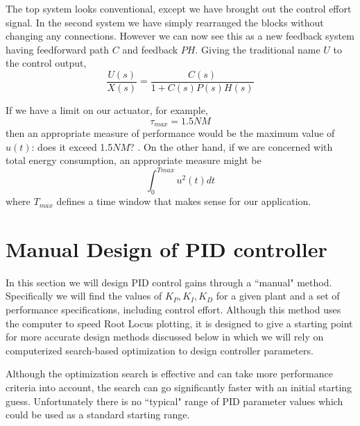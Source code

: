 The top system looks conventional, except we have brought out the control effort signal.   In the second system we have simply rearranged the blocks without changing any connections.   However we can now see this as a new feedback system having feedforward path $C$ and feedback $PH$.  Giving the traditional name  $U$ to the control output,	%
\[
\frac{U(s)}{X(s)} = \frac {C(s)}  {1+C(s)P(s)H(s)}
\]



If we have a limit on our actuator, for example,	%
\[
\tau_{max} = 1.5 NM
\]
then an appropriate measure of performance would be the maximum value of $u(t)$: does it exceed 1.5$NM$? .   On the other hand, if we are concerned with total energy consumption, an appropriate measure might be	%
\[
\int_0^{Tmax} u^2(t) dt
\]
where $T_{max}$ defines a time window that makes sense for our application.	%










\section{Manual Design of PID controller}

In this section we will design PID control gains through a ``manual" method.  Specifically we will find the values of $K_P, K_I, K_D$ for a given plant and a set of performance specifications, including control effort.  Although this method uses the computer to speed Root Locus plotting, it is designed to give a starting point for more accurate design methods discussed below in which 
we will rely on computerized search-based optimization to design controller parameters.  

Although the optimization search is effective and can take more performance criteria into account, the search can go significantly faster with an initial starting guess.   Unfortunately there is no ``typical" range of PID parameter values which could be used as a standard starting range.  

